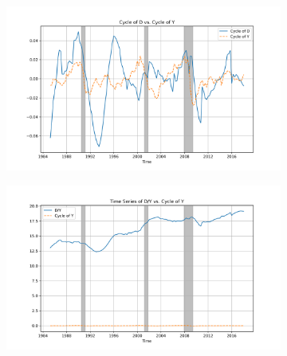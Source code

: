 \documentclass{article}
\begin{document}
\begin{figure}[H!]
\centering
\begin{subfigure}{0.45\textwidth}
  \centering
  \includegraphics[width=\linewidth]{D_cycle_vs_Y_cycle.png}
\end{subfigure}%
\hspace{0.05\textwidth} %
\begin{subfigure}{0.45\textwidth}
  \centering
  \includegraphics[width=\linewidth]{D_Y_vs_Y_cycle.png}
\end{subfigure}

\vspace{1em} %


\end{figure}
\end{document}
